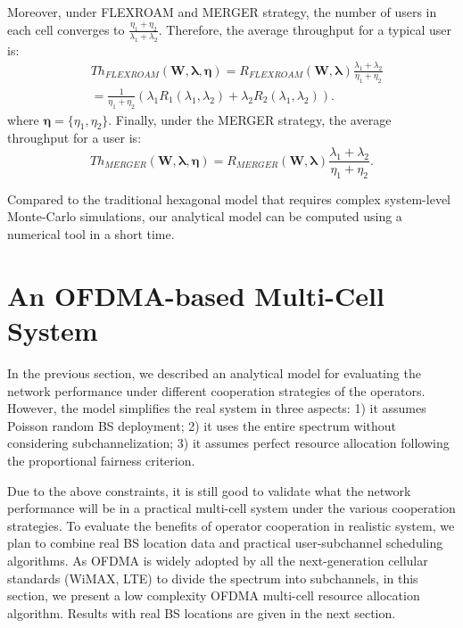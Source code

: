 \documentclass[conference]{IEEEtran}
\begin{document}
Moreover, under FLEXROAM and MERGER strategy, the number of users in each cell converges to $\frac{\eta_1 + \eta_2}{\lambda_1 + \lambda_2}$. Therefore, the average throughput for a typical user is:
\begin{eqnarray}
& Th_{FLEXROAM}(\mathbf{W}, \boldsymbol \lambda, \boldsymbol \eta) = R_{FLEXROAM}(\mathbf{W}, \boldsymbol \lambda) \frac{\lambda_1 + \lambda_2}{\eta_1 + \eta_2} \nonumber \\
&= \frac{1}{\eta_1 + \eta_2} (\lambda_1 R_1(\lambda_1, \lambda_2) + \lambda_2 R_2(\lambda_1, \lambda_2)).
\end{eqnarray}
where $\boldsymbol \eta = \{{\eta_1, \eta_2}\}$. Finally, under the MERGER strategy, the average throughput for a user is:
\begin{equation}
Th_{MERGER}(\mathbf{W}, \boldsymbol \lambda, \boldsymbol \eta) = R_{MERGER}(\mathbf{W}, \boldsymbol \lambda) \frac{\lambda_1 + \lambda_2}{\eta_1 + \eta_2}.
\end{equation}

Compared to the traditional hexagonal model that requires complex system-level Monte-Carlo simulations, our analytical model can be computed using a numerical tool in a short time.

\section{An OFDMA-based Multi-Cell System}

In the previous section, we described an analytical model for evaluating the network performance under different cooperation strategies of the operators. However, the model simplifies the real system in three aspects: 1) it assumes Poisson random BS deployment; 2) it uses the entire spectrum without considering subchannelization; 3) it assumes perfect resource allocation following the proportional fairness criterion.

Due to the above constraints, it is still good to validate what the network performance will be in a practical multi-cell system under the various cooperation strategies. To evaluate the benefits of operator cooperation in realistic system, we plan to combine real BS location data and practical user-subchannel scheduling algorithms. As OFDMA is widely adopted by all the next-generation cellular standards (WiMAX, LTE) to divide the spectrum into subchannels, in this section, we present a low complexity OFDMA multi-cell resource allocation algorithm. Results with real BS locations are given in the next section.
\end{document}
